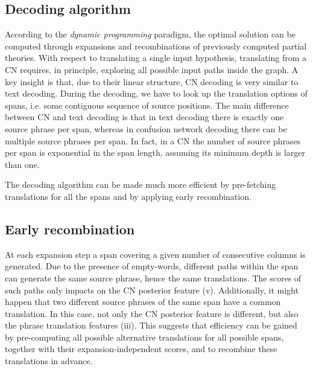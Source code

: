 \documentclass[10pt]{report}
\theoremstyle{plain}
\begin{document}
{\subsection{Decoding algorithm}
\label{sec:decoding}
\noindent
According  to  the {\em  dynamic  programming}  paradigm, the  optimal
solution can be computed through expansions and recombinations of  
previously computed  partial  theories.  With respect to translating a
single input hypothesis, translating from a CN requires, 
in principle, exploring all possible input paths inside the graph. 
A key insight is that, due to their linear structure, CN
decoding is very similar to text decoding.  During the
decoding, we have to look up the translation options of spans, i.e. some
contiguous sequence of source positions.  The main
difference between CN and text decoding is that in text
decoding there is exactly one source phrase per span, whereas in
confusion network decoding there can be multiple source phrases per
span.  In fact, in a CN the number of source phrases
per span is exponential in the span length, assuming its minimum depth is larger than one.

\noindent
The decoding algorithm can be made much more efficient by 
pre-fetching translations for all the spans and by applying  early recombination. 

\subsection{Early recombination}
\label{sec:early-rec}
\noindent
At each expansion step  a span covering a given number of consecutive columns is generated. 
Due to the presence of empty-words, different paths within the span can 
generate the same source phrase, hence the same translations. The scores of such 
paths only impacts on the CN posterior feature (v).  Additionally, it might happen that two 
different source phrases of the same span have a common translation. In this case, not only the CN 
posterior feature is different, but also the phrase translation features (iii).
This  suggests that efficiency can be gained by pre-computing all possible alternative
 translations for all possible spans, together with their expansion-independent scores, 
 and to recombine these translations in advance.  
  
}
\end{document}
